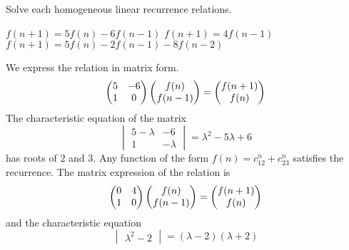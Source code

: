 \begin{exercises}
  \item 
   Solve each homogeneous linear recurrence relations.
   \begin{exparts}
     \partsitem $f(n+1)=5f(n)-6f(n-1)$   
     \partsitem $f(n+1)=4f(n-1)$   
     \partsitem $f(n+1)=5f(n)-2f(n-1)-8f(n-2)$   
   \end{exparts}
   \begin{answer}
    \begin{exparts}
      \partsitem 
        We express the relation in matrix form.
        \begin{equation*}
          \begin{pmatrix}
            5  &-6  \\
            1  &0
          \end{pmatrix}
          \begin{pmatrix} f(n) \\ f(n-1) \end{pmatrix}
          =
          \begin{pmatrix} f(n+1) \\ f(n) \end{pmatrix}
        \end{equation*}
        The characteristic equation of the matrix
        \begin{equation*}
          \begin{vmatrix}
            5-\lambda &-6       \\
            1         &-\lambda
          \end{vmatrix}
          =\lambda^2-5\lambda+6 
        \end{equation*}
        has roots of $2$ and $3$.
        Any function of the form
        $f(n)=c_12^n+c_23^n$
        satisfies the recurrence.
      \partsitem 
        The matrix expression of the relation is 
        \begin{equation*}
          \begin{pmatrix}
            0  &4  \\
            1  &0  
          \end{pmatrix}
          \begin{pmatrix} f(n) \\ f(n-1) \end{pmatrix}
          =
          \begin{pmatrix} f(n+1) \\ f(n) \end{pmatrix}
        \end{equation*}
        and the characteristic equation
        \begin{equation*}
          \begin{vmatrix}
            \lambda^2-2       
          \end{vmatrix}
          =(\lambda-2)(\lambda+2)
        \end{equation*}

\end{exparts}
\end{answer}
\end{exercises}
